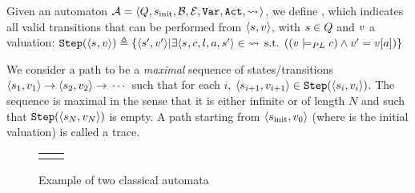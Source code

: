 \begin{definition}[Transition]
  \label{sec:system-definition}
Given an automaton
$\mathcal{A}{} = \allowbreak{}
\langle Q{}, \allowbreak{}
s_{\text{init}}{}, \allowbreak{}
\mathcal{B}{}, \allowbreak{}
\mathcal{E}{}, \allowbreak{}
\text{\texttt{Var}}{}, \allowbreak{}
\text{\texttt{Act}}{}, \allowbreak{}
{\rightsquigarrow{}\!}{}\rangle$, we define \automatanext{}, which
indicates all valid transitions that can be performed from
$\langle s_{}, v_{}\rangle$, with
$s \in Q{}$ and $v_{}$ a valuation:
$\automatanext{}(\langle \automatastate{}, \automataenvironment{}\rangle)
\triangleq \{\langle \automatastate{}', \automataenvironment{}'\rangle
|
   \existsin{\langle \automatastate{}, c, l, a, \automatastate{}' \rangle}{\automatarelations{}}{%
      (\automataenvironment{} \models_{PL} c)
      \land
      \automataenvironment{}' = \automataenvironment{}[a]
   }\}
$
\end{definition}

\begin{definition}
\label{def:formal_methods:trace}
We consider a path to be a \emph{maximal} sequence of
states/transitions
$\langle s_{1}, v_{1}\rangle
\to{} \langle s_{2},
v_{2}\rangle \to{} \cdots$ such that
for each $i$,
$\langle s_{i+1}, v_{i+1}\rangle \in
\text{\texttt{Step}}{}(\langle s_{i},
v_{i}\rangle) $. The sequence is maximal in the
sense that it is either infinite or of length $N$ and such that
$\text{\texttt{Step}}{}(\langle s_{N},
v_{N}\rangle)$ is empty. A path
starting from
$ \langle s_{\text{init}}{}, v_{0}\rangle$ (where
 is the initial valuation) is called a trace.
\end{definition}

\begin{figure}[hbt!]
   \centering
   \begin{tabular}{cc}
    &
   
   \end{tabular}
   \caption{Example of two classical automata}
   \label{fig:classical_automata}
\end{figure}

